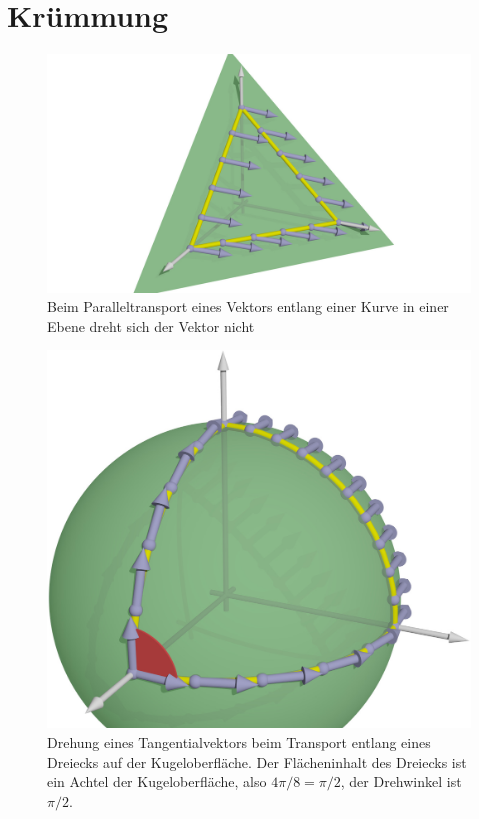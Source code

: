 %
%
%
\section{Krümmung
\label{skript:kruemmung:section:kruemmung}}

\begin{figure}
\centering
\includegraphics[width=\hsize]{chapters/3d/flach.jpg}
\caption{Beim Paralleltransport eines Vektors entlang einer Kurve in
einer Ebene dreht sich der Vektor nicht
\label{skript:kruemmung:transportflach}}
\end{figure}
\begin{figure}
\centering
\includegraphics[width=\hsize]{chapters/3d/sphere.jpg}
\caption{Drehung eines Tangentialvektors beim Transport entlang eines
Dreiecks auf der Kugeloberfläche.
Der Flächeninhalt des Dreiecks ist ein Achtel der Kugeloberfläche,
also $4\pi/8=\pi/2$, der Drehwinkel ist $\pi/2$.
\label{skript:kruemmung:transportkugel}}
\end{figure}

